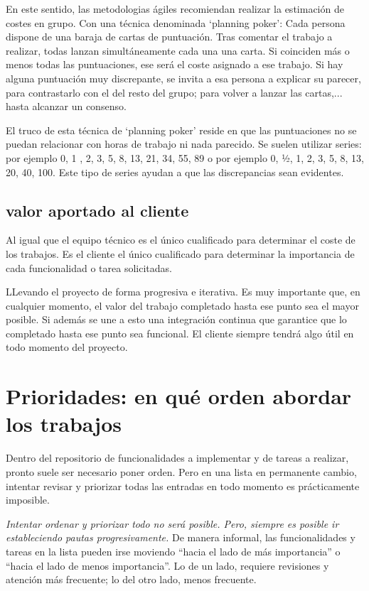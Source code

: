 \documentclass[spanish,12pt,a4paper,final,oneside]{book}
\begin{document}
En este sentido, las metodologias ágiles recomiendan realizar la estimación de costes en grupo. Con una técnica denominada `planning poker': Cada persona dispone de una baraja de cartas de puntuación. Tras comentar el trabajo a realizar, todas lanzan simultáneamente cada una una carta. Si  coinciden más o menos todas las puntuaciones, ese será el coste asignado a ese trabajo. Si hay alguna puntuación muy discrepante, se invita a esa persona a explicar su parecer, para contrastarlo con el del resto del grupo; para volver a lanzar las cartas,... hasta alcanzar un consenso.

El truco de esta técnica de `planning poker' reside en que las puntuaciones no se puedan relacionar con horas de trabajo ni nada parecido. Se suelen utilizar series: por ejemplo 0, 1 , 2, 3, 5, 8, 13, 21, 34, 55, 89 o por ejemplo 0, ½, 1, 2, 3, 5, 8, 13, 20, 40, 100. Este tipo de series ayudan a que las discrepancias sean evidentes.
\subsection{valor aportado al cliente}
Al igual que el equipo técnico es el único cualificado para determinar el coste de los trabajos. Es el cliente el único cualificado para determinar la importancia de cada funcionalidad o tarea solicitadas.

LLevando el proyecto de forma progresiva e iterativa. Es muy importante que, en cualquier momento, el valor del trabajo completado hasta ese punto sea el mayor posible. Si además se une a esto una integración continua que garantice que lo completado hasta ese punto sea funcional. El cliente siempre tendrá algo útil en todo momento del proyecto.

\section{Prioridades: en qué orden abordar los trabajos}
Dentro del repositorio de funcionalidades a implementar y de tareas a realizar, pronto suele ser necesario poner orden. Pero en una lista en permanente cambio, intentar revisar y priorizar todas las entradas en todo momento es prácticamente imposible.

\textit{Intentar ordenar y priorizar todo no será posible. Pero, siempre es posible ir estableciendo pautas progresivamente.} De manera informal, las funcionalidades y tareas en la lista pueden irse moviendo ``hacia el lado de más importancia'' o ``hacia el lado de menos importancia''. Lo de un lado, requiere revisiones y atención más frecuente; lo del otro lado, menos frecuente.
\end{document}

